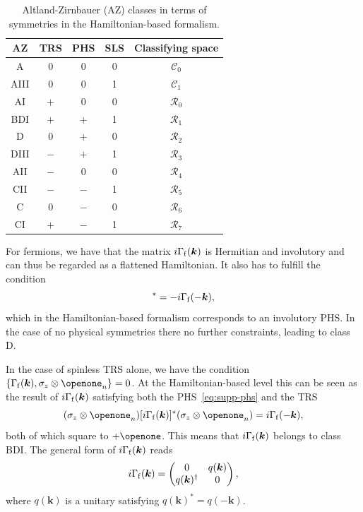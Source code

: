 \documentclass[prl,twocolumn,preprintnumbers,superscriptaddress,amsmath,amssymb]{revtex4-1}
\begin{document}
\begin{table}[h]
\caption{Altland-Zirnbauer (AZ) classes in terms of symmetries in the Hamiltonian-based formalism.}
\label{tab:AZ}
\begin{center}
\begin{tabular}{c|ccc|c}
\hline\hline
AZ & TRS & PHS & SLS & Classifying space \\
\hline
A    & 0 & 0 & 0 & $\mathcal{C}_0$ \\
AIII & 0 & 0 & 1 & $\mathcal{C}_1$ \\
\hline
AI   & $+$ & 0 & 0 & $\mathcal{R}_0$ \\
BDI  & $+$ & $+$ & 1 & $\mathcal{R}_1$ \\
D    & 0 & $+$ & 0 & $\mathcal{R}_2$ \\
DIII & $-$ & $+$ & 1 & $\mathcal{R}_3$ \\
AII  & $-$ & 0 & 0 & $\mathcal{R}_4$ \\
CII  & $-$ & $-$ & 1 & $\mathcal{R}_5$ \\
C    & 0 & $-$ & 0 & $\mathcal{R}_6$ \\
CI   & $+$ & $-$ & 1 & $\mathcal{R}_7$ \\
\hline\hline
\end{tabular}
\end{center}
\end{table}


For fermions, we have that the matrix $i\Gamma_{\rm f}(\boldsymbol{k})$ is Hermitian and involutory and can thus be regarded as a flattened Hamiltonian. It also has to fulfill the condition 
\begin{equation}
    [i\Gamma_{\rm f}(\boldsymbol{k})]^*=-i\Gamma_{\rm f}(-\boldsymbol{k}),
    \label{eq:supp-phs}
\end{equation}
which in the Hamiltonian-based formalism corresponds to an involutory PHS. In the case of no physical symmetries there no further constraints, leading to class D.

In the case of spinless TRS alone, we have the condition $\{\Gamma_{\rm f}(\boldsymbol{k}),\sigma_z\otimes\openone_n\}=0$. At the Hamiltonian-based level this can be seen as the result of $i\Gamma_{\rm f}(\boldsymbol{k})$ satisfying both the PHS~\eqref{eq:supp-phs} and the TRS
\begin{equation}
    (\sigma_z\otimes\openone_n) [i\Gamma_{\rm f}(\boldsymbol{k})]^* (\sigma_z\otimes\openone_n)=i\Gamma_{\rm f}(-\boldsymbol{k}),
    \label{BDITRS}
\end{equation}
both of which square to $+\openone$. This means that $i\Gamma_{\rm f}(\boldsymbol{k})$ belongs to class BDI. The general form of $i\Gamma_{\rm f}(\boldsymbol{k})$ reads 
\begin{equation}
i\Gamma_{\rm f}(\boldsymbol{k})=\begin{pmatrix} 0 & q(\boldsymbol{k}) \\ q(\boldsymbol{k})^\dag & 0 \end{pmatrix},
\label{BDIH}
\end{equation}
where $q(\boldsymbol{k})$ is a unitary satisfying $q(\boldsymbol{k})^*=q(-\boldsymbol{k})$.
\end{document}
